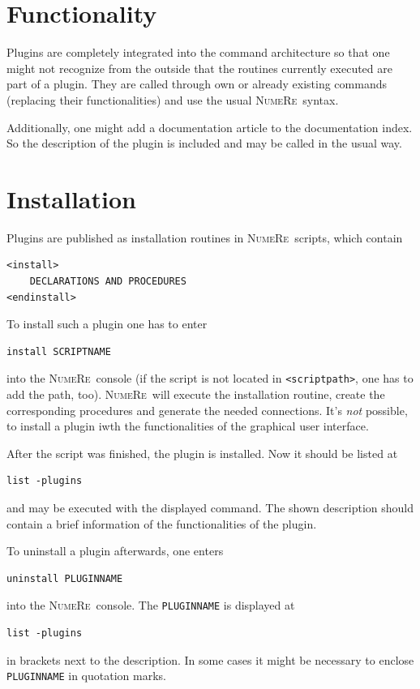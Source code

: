 \documentclass[DIV=14,headsepline,footsepline]{scrbook}
\newcommand{\NR}{\textsc{Nu\-me\-Re}}
\begin{document}
			\section{Functionality}
				Plugins are completely integrated into the command architecture so that one might not recognize from the outside that the routines currently executed are part of a plugin. They are called through own or already existing commands (replacing their functionalities) and use the usual \NR\ syntax.
				
				Additionally, one might add a documentation article to the documentation index. So the description of the plugin is included and may be called in the usual way.
			\section{Installation}
				Plugins are published as installation routines in \NR\ scripts, which contain
				\begin{lstlisting}
<install>
	DECLARATIONS AND PROCEDURES
<endinstall>
				\end{lstlisting}
				To install such a plugin one has to enter
				\begin{lstlisting}
install SCRIPTNAME
				\end{lstlisting}
				into the \NR\ console (if the script is not located in \lstinline+<scriptpath>+, one has to add the path, too). \NR\ will execute the installation routine, create the corresponding procedures and generate the needed connections. It's \emph{not} possible, to install a plugin iwth the functionalities of the graphical user interface.
				
				After the script was finished, the plugin is installed. Now it should be listed at
				\begin{lstlisting}
list -plugins
				\end{lstlisting}
				and may be executed with the displayed command. The shown description should contain a brief information of the functionalities of the plugin.
				
				To uninstall a plugin afterwards, one enters
				\begin{lstlisting}
uninstall PLUGINNAME
				\end{lstlisting}
				into the \NR\ console. The \lstinline+PLUGINNAME+ is displayed at
				\begin{lstlisting}
list -plugins
				\end{lstlisting}
				in brackets next to the description. In some cases it might be necessary to enclose \lstinline+PLUGINNAME+ in quotation marks.
\end{document}
